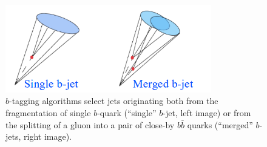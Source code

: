 
\begin{figure}[h]
\centering
\includegraphics[width=0.8\textwidth]{FIGS/Single_b_Merged_bb.png}
\caption{$b$-tagging algorithms select jets originating both from the fragmentation of single $b$-quark (``single'' $b$-jet, left image) or from the splitting of a gluon into a pair of close-by $b \bar{b}$ quarks (``merged'' $b$-jets, right image).}
\label{fig:gbbcartoon}
\end{figure}




